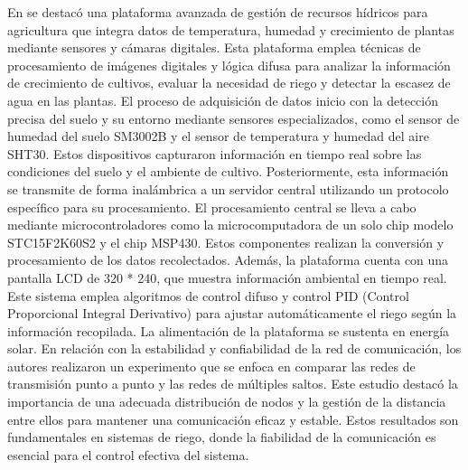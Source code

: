 \bigbreak
En \cite{haiyan_intelligent_2022} se destacó una plataforma avanzada de gestión de recursos hídricos para agricultura que integra datos de temperatura, humedad y crecimiento de plantas mediante sensores y cámaras digitales. Esta plataforma emplea técnicas de procesamiento de imágenes digitales y lógica difusa para analizar la información de crecimiento de cultivos, evaluar la necesidad de riego y detectar la escasez de agua en las plantas. El proceso de adquisición de datos inicio con la detección precisa del suelo y su entorno mediante sensores especializados, como el sensor de humedad del suelo SM3002B y el sensor de temperatura y humedad del aire SHT30. Estos dispositivos capturaron información en tiempo real sobre las condiciones del suelo y el ambiente de cultivo. Posteriormente, esta información se transmite de forma inalámbrica a un servidor central utilizando un protocolo específico para su procesamiento. El procesamiento central se lleva a cabo mediante microcontroladores como la microcomputadora de un solo chip modelo STC15F2K60S2 y el chip MSP430. Estos componentes realizan la conversión y procesamiento de los datos recolectados. Además, la plataforma cuenta con una pantalla LCD de 320 * 240, que muestra información ambiental en tiempo real. Este sistema emplea algoritmos de control difuso y control PID (Control Proporcional Integral Derivativo) para ajustar automáticamente el riego según la información recopilada. La alimentación de la plataforma se sustenta en energía solar. En relación con la estabilidad y confiabilidad de la red de comunicación, los autores realizaron un experimento que se enfoca en comparar las redes de transmisión punto a punto y las redes de múltiples saltos. Este estudio destacó la importancia de una adecuada distribución de nodos y la gestión de la distancia entre ellos para mantener una comunicación eficaz y estable. Estos resultados son fundamentales en sistemas de riego, donde la fiabilidad de la comunicación es esencial para el control efectiva del sistema.

